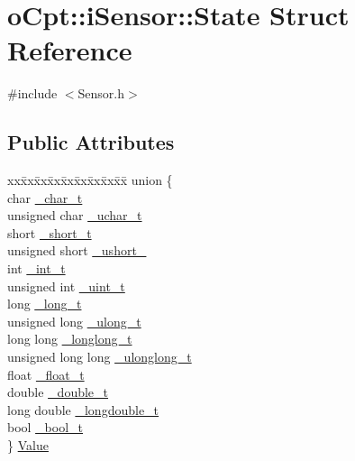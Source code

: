 \hypertarget{structo_cpt_1_1i_sensor_1_1_state}{}\section{o\+Cpt\+:\+:i\+Sensor\+:\+:State Struct Reference}
\label{structo_cpt_1_1i_sensor_1_1_state}


{\ttfamily \#include $<$Sensor.\+h$>$}

\subsection*{Public Attributes}
\begin{DoxyCompactItemize}
\item 
\begin{tabbing}
xx\=xx\=xx\=xx\=xx\=xx\=xx\=xx\=xx\=\kill
union \{\\
\>char \hyperlink{structo_cpt_1_1i_sensor_1_1_state_aa6875deee11cadef450628abfb921433}{\_char\_t}\\
\>unsigned char \hyperlink{structo_cpt_1_1i_sensor_1_1_state_adf5ba8a9d7c7fb09c8b7dde0f31eb1ff}{\_uchar\_t}\\
\>short \hyperlink{structo_cpt_1_1i_sensor_1_1_state_a9587fed0e3ca808991cacd3a48864543}{\_short\_t}\\
\>unsigned short \hyperlink{structo_cpt_1_1i_sensor_1_1_state_a36abb89f7a753a10655e952774a9f9b2}{\_ushort\_}\\
\>int \hyperlink{structo_cpt_1_1i_sensor_1_1_state_ad3d4dd9ca55d0981fe95bdd44109e652}{\_int\_t}\\
\>unsigned int \hyperlink{structo_cpt_1_1i_sensor_1_1_state_a8c2ab532f7decce84a7dee6685b2a84d}{\_uint\_t}\\
\>long \hyperlink{structo_cpt_1_1i_sensor_1_1_state_a42d22a8651aac335bd4c172b83da99ce}{\_long\_t}\\
\>unsigned long \hyperlink{structo_cpt_1_1i_sensor_1_1_state_a06a7e1a6a5cf0fe163eef6c529fddd4d}{\_ulong\_t}\\
\>long long \hyperlink{structo_cpt_1_1i_sensor_1_1_state_a4f9af9a5b838de5dfac4d384b9d8bd41}{\_longlong\_t}\\
\>unsigned long long \hyperlink{structo_cpt_1_1i_sensor_1_1_state_ac62a5b32e4a5e848a2c504c5ec1fb64a}{\_ulonglong\_t}\\
\>float \hyperlink{structo_cpt_1_1i_sensor_1_1_state_a60e54b95f5d16f5bbf26c859945e32ce}{\_float\_t}\\
\>double \hyperlink{structo_cpt_1_1i_sensor_1_1_state_a27f4d36ade9af93591cf14e77a2c45df}{\_double\_t}\\
\>long double \hyperlink{structo_cpt_1_1i_sensor_1_1_state_a4d0b6ba1f59a81d5470eb04c1faf2020}{\_longdouble\_t}\\
\>bool \hyperlink{structo_cpt_1_1i_sensor_1_1_state_a528ceb2550c1240a52ba9d7ae504c611}{\_bool\_t}\\
\} \hyperlink{structo_cpt_1_1i_sensor_1_1_state_a06647568e4b1b28e5a22dd385bd0c934}{Value}\\


\end{tabbing}
\end{DoxyCompactItemize}
